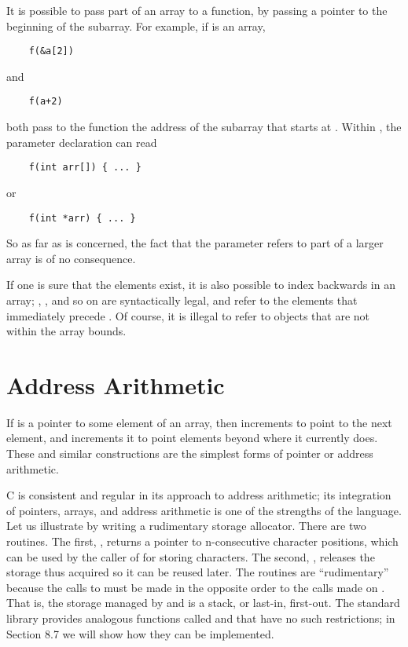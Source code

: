 It is possible to pass part of an array to a function, by passing a pointer to the beginning of the subarray. For example, if  is an array,
\begin{lstlisting}
    f(&a[2])
\end{lstlisting}
and
\begin{lstlisting}
    f(a+2)
\end{lstlisting}
both pass to the function  the address of the subarray that starts at .
Within , the parameter declaration can read
\begin{lstlisting}
    f(int arr[]) { ... }
\end{lstlisting}
or
\begin{lstlisting}
    f(int *arr) { ... }
\end{lstlisting}
So as far as  is concerned, the fact that the parameter refers to part of a larger array is of no consequence.

If one is sure that the elements exist, it is also possible to index backwards in an array; , , and so on are syntactically legal, and refer to the elements that immediately precede .
Of course, it is illegal to refer to objects that are not within the array bounds.



\section{Address Arithmetic}


If  is a pointer to some element of an array, then  increments  to point to the next element, and  increments it to point  elements beyond where it currently does.
These and similar constructions are the simplest forms of pointer or address arithmetic.

C is consistent and regular in its approach to address arithmetic; its integration of pointers, arrays, and address arithmetic is one of the strengths of the language.
Let us illustrate by writing a rudimentary storage allocator.
There are two routines.
The first, , returns a pointer  to n-consecutive character positions, which can be used by the caller of  for storing characters.
The second, , releases the storage thus acquired so it can be reused later.
The routines are ``rudimentary'' because the calls to  must be made in the opposite order to the calls made on .
That is, the storage managed by  and  is a stack, or last-in, first-out.
The standard library provides analogous functions called  and  that have no such restrictions; in Section 8.7 we will show how they can be implemented.

